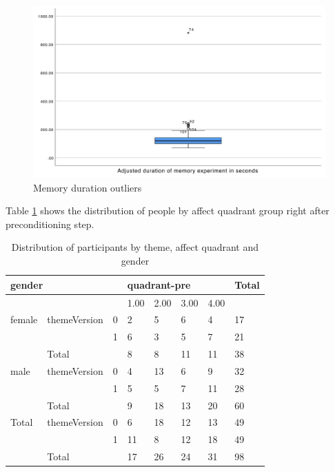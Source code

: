 		
		\begin{figure}
			\centering
			\includegraphics[width=0.7\linewidth]{graphics/memoryOutlier2}
			\caption{Memory duration outliers }
			\label{fig:memoryoutlier2}
		\end{figure}
	
		Table \ref{tbl:distribution} shows the distribution of people by affect quadrant group right after preconditioning step. 

		\begin{table}[h!]
			\centering
			\begin{tabular}{ll|l|llll|l}
				\hline
				\multicolumn{3}{l}{gender} & \multicolumn{4}{l}{quadrant-pre} & Total \\ \hline
				&              &   & 1.00    & 2.00   & 3.00   & 4.00   &       \\ \hline
				female  & themeVersion & 0 & 2       & 5      & 6      & 4      & 17    \\
				&              & 1 & 6       & 3      & 5      & 7      & 21    \\ \hline
				& Total        &   & 8       & 8      & 11     & 11     & 38    \\ \hline \hline
				male    & themeVersion & 0 & 4       & 13     & 6      & 9      & 32    \\
				&              & 1 & 5       & 5      & 7      & 11     & 28    \\ \hline
				& Total        &   & 9       & 18     & 13     & 20     & 60    \\ \hline \hline
				Total   & themeVersion & 0 & 6       & 18     & 12     & 13     & 49    \\
				&              & 1 & 11      & 8      & 12     & 18     & 49    \\ \hline \hline
				& Total        &   & 17      & 26     & 24     & 31     & 98 	\\ \hline \hline
			\end{tabular}
			\caption{Distribution of participants by theme, affect quadrant and gender}
			\label{tbl:distribution}
		\end{table}
		
